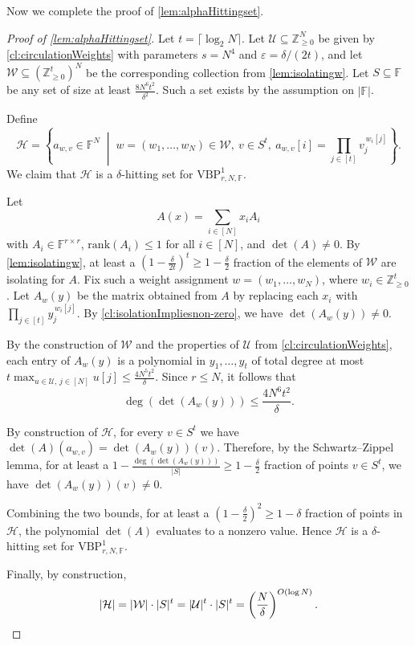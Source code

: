 \documentclass[11pt]{article}
\newcommand{\eps}{\varepsilon}
\renewcommand{\epsilon}{\eps}
\newcommand{\rank}{\mathrm{rank}}
\newcommand{\F}{\mathbb{F}}
\newcommand{\Z}{\mathbb{Z}}
\newcommand{\VBP}{\mathrm{VBP}}
\newcommand{\VP}[3]{\VBP_{#1,#2,#3}^1}
\begin{document}
Now we complete the proof of \cref{lem:alphaHittingset}.

\begin{proof}[Proof of \cref{lem:alphaHittingset}]
Let $t=\lceil \log_2 N\rceil$. Let $\mathcal{U}\subseteq \Z_{\geq 0}^N$ be given by \cref{cl:circulationWeights} with parameters $s=N^4$ and $\epsilon=\delta/(2t)$, and let $\mathcal{W}\subseteq (\Z_{\geq 0}^{t})^N$ be the corresponding collection from \cref{lem:isolatingw}. Let $S\subseteq \F$ be any set of size at least $\frac{8N^6t^2}{\delta^2}$. Such a set exists by the assumption on $|\F|$.

Define
\[
\mathcal{H}=\left\{ a_{w,v}\in \F^N \;\middle|\; w=(w_1,\dots,w_N)\in \mathcal{W},\ v\in S^t,\ a_{w,v}[i]=\prod_{j\in [t]} v_j^{\,w_i[j]} \right\}.
\]
We claim that $\mathcal{H}$ is a $\delta$-hitting set for $\VP{r}{N}{\F}$.

Let
\[
A(x)=\sum_{i\in [N]} x_i A_i
\]
with $A_i\in \F^{r\times r}$, $\rank(A_i)\le 1$ for all $i\in [N]$, and $\det(A)\neq 0$. By \cref{lem:isolatingw}, at least a $\left(1-\frac{\delta}{2t}\right)^t \ge 1-\frac{\delta}{2}$ fraction of the elements of $\mathcal{W}$ are isolating for $A$. Fix such a weight assignment $w=(w_1,\dots,w_N)$, where $w_i\in \Z_{\geq 0}^t$. Let $A_w(y)$ be the matrix obtained from $A$ by replacing each $x_i$ with $\prod_{j\in [t]} y_j^{\,w_i[j]}$. By \cref{cl:isolationImpliesnon-zero}, we have $\det(A_w(y))\neq 0$.

By the construction of $\mathcal{W}$ and the properties of $\mathcal{U}$ from \cref{cl:circulationWeights}, each entry of $A_w(y)$ is a polynomial in $y_1,\dots,y_t$ of total degree at most $t\max_{u\in \mathcal{U},\, j\in [N]} u[j]\le \frac{4N^5t^2}{\delta}$. Since $r\le N$, it follows that
\[
\deg(\det(A_w(y))) \le \frac{4N^6t^2}{\delta}.
\]

By construction of $\mathcal{H}$, for every $v\in S^t$ we have $\det(A)(a_{w,v})=\det(A_w(y))(v)$. Therefore, by the Schwartz--Zippel lemma, for at least a $1-\frac{\deg(\det(A_w(y)))}{|S|}\ge 1-\frac{\delta}{2}$ fraction of points $v\in S^t$, we have $\det(A_w(y))(v)\neq 0$.

Combining the two bounds, for at least a $\left(1-\frac{\delta}{2}\right)^2 \ge 1-\delta$ fraction of points in $\mathcal{H}$, the polynomial $\det(A)$ evaluates to a nonzero value. Hence $\mathcal{H}$ is a $\delta$-hitting set for $\VP{r}{N}{\F}$.

Finally, by construction, 
\[
|\mathcal{H}|=|\mathcal{W}|\cdot |S|^t = |\mathcal{U}|^t\cdot |S|^t
= \left(\frac{N}{\delta}\right)^{O(\log N)}. \qedhere
\]
\end{proof}
\end{document}
